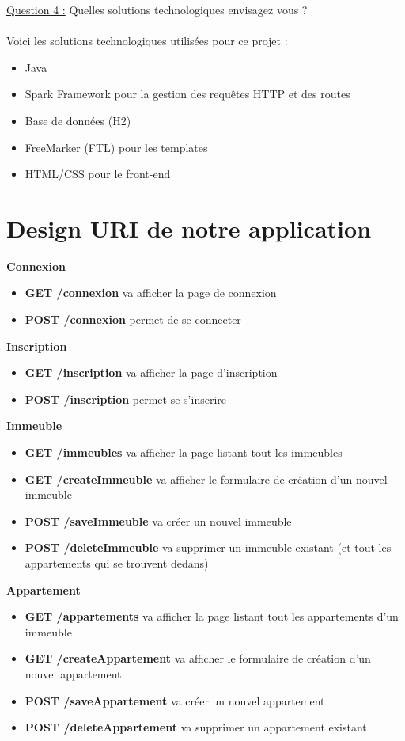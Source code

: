 \documentclass[french]{article}
\begin{document}
\underline{Question 4 :} Quelles solutions technologiques envisagez vous ? \\ \\
Voici les solutions technologiques utilisées pour ce projet :
\begin{itemize}
\item Java
\item Spark Framework pour la gestion des requêtes HTTP et des routes
\item Base de données (H2)
\item FreeMarker (FTL) pour les templates 
\item HTML/CSS pour le front-end
\end{itemize}

\section{Design URI de notre application}
\noindent \textbf{Connexion}
\begin{itemize}
\item \textbf{GET /connexion} va afficher la page de connexion
\item \textbf{POST /connexion} permet de se connecter \\
\end{itemize}

\noindent \textbf{Inscription}
\begin{itemize}
\item \textbf{GET /inscription} va afficher la page d'inscription
\item \textbf{POST /inscription} permet se s'inscrire \\
\end{itemize}

\noindent \textbf{Immeuble}
\begin{itemize}
\item \textbf{GET /immeubles} va afficher la page listant tout les immeubles
\item \textbf{GET /createImmeuble} va afficher le formulaire de création d'un nouvel immeuble
\item \textbf{POST /saveImmeuble} va créer un nouvel immeuble
\item \textbf{POST /deleteImmeuble} va supprimer un immeuble existant (et tout les appartements qui se trouvent dedans) \\
\end{itemize}

\noindent \textbf{Appartement}
\begin{itemize}
\item \textbf{GET /appartements} va afficher la page listant tout les appartements d'un immeuble
\item \textbf{GET /createAppartement} va afficher le formulaire de création d'un nouvel appartement
\item \textbf{POST /saveAppartement} va créer un nouvel appartement
\item \textbf{POST /deleteAppartement} va supprimer un appartement existant \\
\end{itemize}
\end{document}
